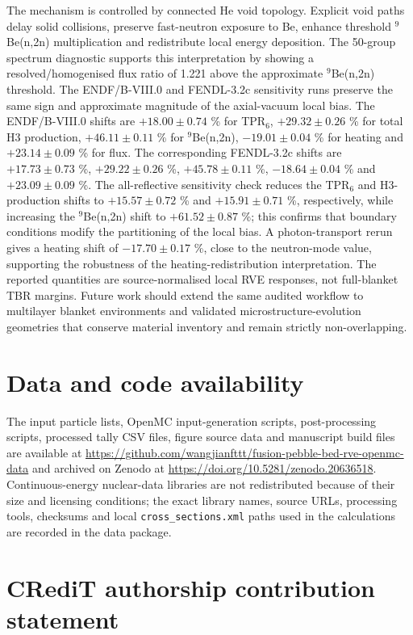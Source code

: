 \documentclass[preprint,12pt]{elsarticle}
\begin{document}
The mechanism is controlled by connected He void topology.  Explicit void paths
delay solid collisions, preserve fast-neutron exposure to Be, enhance
threshold $^9$Be(n,2n) multiplication and redistribute local energy deposition.
The 50-group spectrum diagnostic supports this interpretation by showing a
resolved/homogenised flux ratio of 1.221 above the approximate $^9$Be(n,2n)
threshold.  The ENDF/B-VIII.0 and FENDL-3.2c sensitivity runs preserve the same
sign and approximate magnitude of the axial-vacuum local bias.  The
ENDF/B-VIII.0 shifts are $+18.00\pm0.74$ \% for TPR$_6$,
$+29.32\pm0.26$ \% for total H3 production, $+46.11\pm0.11$ \% for
$^9$Be(n,2n), $-19.01\pm0.04$ \% for heating and $+23.14\pm0.09$ \% for
flux.  The corresponding FENDL-3.2c shifts are $+17.73\pm0.73$ \%,
$+29.22\pm0.26$ \%, $+45.78\pm0.11$ \%, $-18.64\pm0.04$ \% and
$+23.09\pm0.09$ \%.  The all-reflective sensitivity check reduces the TPR$_6$ and
H3-production shifts to $+15.57\pm0.72$ \% and $+15.91\pm0.71$ \%, respectively,
while increasing the $^9$Be(n,2n) shift to $+61.52\pm0.87$ \%; this confirms
that boundary conditions modify the partitioning of the local bias.  A
photon-transport rerun gives a heating shift of $-17.70\pm0.17$ \%, close to the
neutron-mode value, supporting the robustness of the heating-redistribution
interpretation.  The reported quantities are source-normalised local RVE
responses, not full-blanket TBR margins.  Future work should extend the same
audited workflow to multilayer blanket environments and validated
microstructure-evolution geometries that conserve material inventory and remain
strictly non-overlapping.

\section*{Data and code availability}

The input particle lists, OpenMC input-generation scripts, post-processing
scripts, processed tally CSV files, figure source data and manuscript build
files are available at
\url{https://github.com/wangjianfttt/fusion-pebble-bed-rve-openmc-data} and
archived on Zenodo at \url{https://doi.org/10.5281/zenodo.20636518}.
Continuous-energy nuclear-data libraries are not redistributed because of their
size and licensing conditions; the exact library names, source URLs, processing
tools, checksums and local \texttt{cross\_sections.xml} paths used in the
calculations are recorded in the data package.

\section*{CRediT authorship contribution statement}
\end{document}
